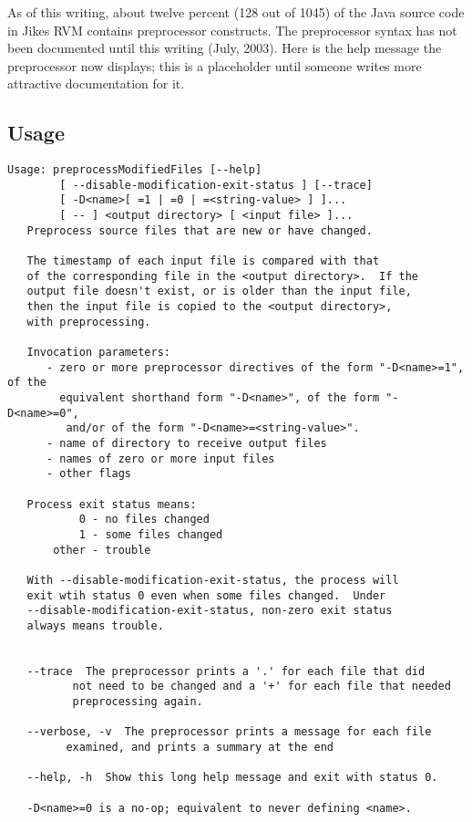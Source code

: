 As of this writing, about twelve percent (128 out of 1045) of the Java
source code in Jikes RVM contains preprocessor constructs.  The
preprocessor syntax has not been documented until this writing (July,
2003).  Here is the help message the preprocessor now displays; this
is a placeholder until someone writes more attractive documentation
for it.

\subsection{Usage}

\begin{verbatim}
Usage: preprocessModifiedFiles [--help]
        [ --disable-modification-exit-status ] [--trace]
        [ -D<name>[ =1 | =0 | =<string-value> ] ]... 
        [ -- ] <output directory> [ <input file> ]...
   Preprocess source files that are new or have changed.

   The timestamp of each input file is compared with that
   of the corresponding file in the <output directory>.  If the
   output file doesn't exist, or is older than the input file,
   then the input file is copied to the <output directory>, 
   with preprocessing.

   Invocation parameters:
      - zero or more preprocessor directives of the form "-D<name>=1", of the
        equivalent shorthand form "-D<name>", of the form "-D<name>=0",
         and/or of the form "-D<name>=<string-value>".
      - name of directory to receive output files
      - names of zero or more input files
      - other flags

   Process exit status means:
           0 - no files changed
           1 - some files changed
       other - trouble

   With --disable-modification-exit-status, the process will
   exit wtih status 0 even when some files changed.  Under
   --disable-modification-exit-status, non-zero exit status
   always means trouble.


   --trace  The preprocessor prints a '.' for each file that did
          not need to be changed and a '+' for each file that needed
          preprocessing again.

   --verbose, -v  The preprocessor prints a message for each file
         examined, and prints a summary at the end 

   --help, -h  Show this long help message and exit with status 0.

   -D<name>=0 is a no-op; equivalent to never defining <name>.


\end{verbatim}

